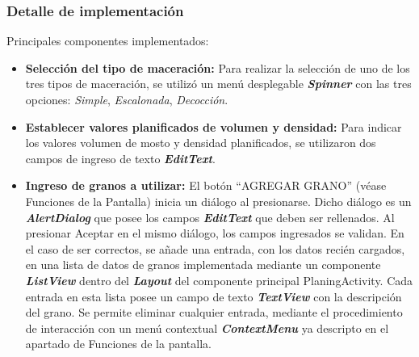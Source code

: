             \subsubsection{Detalle de implementación}
                \par Principales componentes implementados:
                \begin{itemize}
                    \item \textbf{Selección del tipo de maceración:} Para realizar la selección de uno de los tres tipos de maceración, se utilizó un menú desplegable \textbf{\textit{\gls{Spinner}}} con las tres opciones: \textit{Simple}, \textit{Escalonada}, \textit{Decocción}. 
                    
                    \item \textbf{Establecer valores planificados de volumen y densidad:} Para indicar los valores volumen de mosto y densidad planificados, se utilizaron dos campos de ingreso de texto \textbf{\textit{\gls{EditText}}}.
                    
                    \item \textbf{Ingreso de granos a utilizar:} El botón ``AGREGAR GRANO'' (véase Funciones de la Pantalla) inicia un diálogo al presionarse. Dicho diálogo es un \textbf{\textit{\gls{AlertDialog}}} que posee los campos \textbf{\textit{\gls{EditText}}} que deben ser rellenados. 
                    Al presionar Aceptar en el mismo diálogo, los campos ingresados se validan. En el caso de ser correctos, se añade una entrada, con los datos recién cargados, en una lista de datos de granos implementada mediante un componente \textbf{\textit{\gls{ListView}}} dentro del \textbf{\textit{\gls{Layout}}} del componente principal PlaningActivity. Cada entrada en esta lista posee un campo de texto \textbf{\textit{\gls{TextView}}} con la descripción del grano. 
                    Se permite eliminar cualquier entrada, mediante el procedimiento de interacción con un menú contextual \textbf{\textit{\gls{ContextMenu}}} ya descripto en el apartado de Funciones de la pantalla.
                    

\end{itemize}
